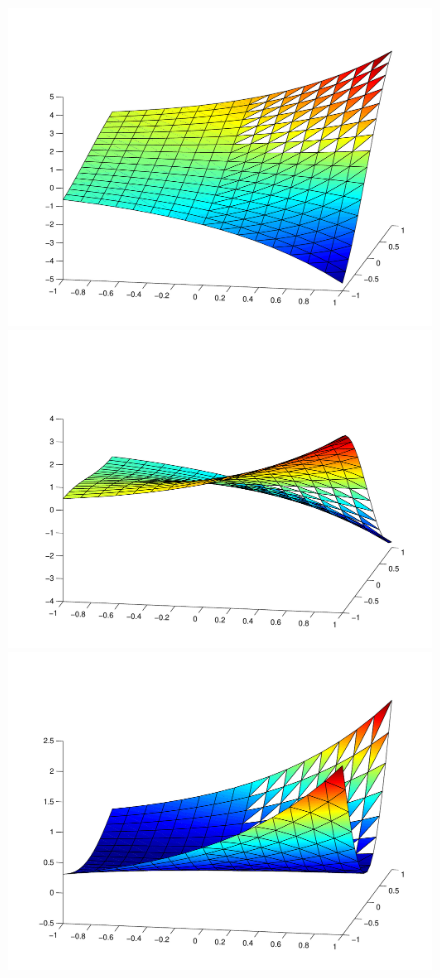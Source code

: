 \begin{figure}[h!b!h!]
\begin{center}
\includegraphics[height=0.27\textheight]{plots/stokesVVPHybrid/pressurecubic16x16.pdf}
\includegraphics[height=0.27\textheight]{plots/stokesVVPHybrid/u1cubic16x16.pdf}
\includegraphics[height=0.27\textheight]{plots/stokesVVPHybrid/u2cubic16x16.pdf}

\end{center}
\end{figure}

